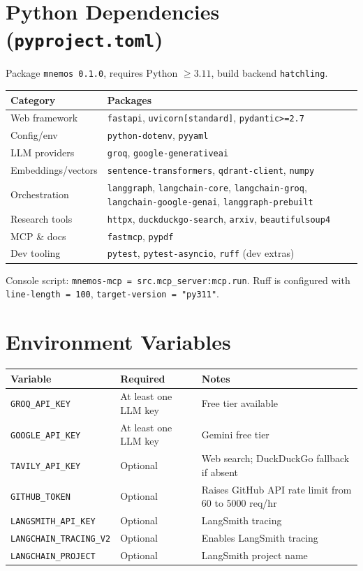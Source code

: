 \documentclass[11pt,a4paper]{report}
\newcommand{\code}[1]{\texttt{\small #1}}
\newcommand{\file}[1]{\texttt{\small\color{accent!70!black}#1}}
\begin{document}
\section{Python Dependencies (\file{pyproject.toml})}

Package \code{mnemos 0.1.0}, requires Python $\geq 3.11$, build backend \code{hatchling}.

\begin{longtable}{L{6.5cm}L{6.5cm}}
\toprule
\textbf{Category} & \textbf{Packages} \\
\midrule
\endhead
Web framework & \code{fastapi}, \code{uvicorn[standard]}, \code{pydantic>=2.7} \\
Config/env & \code{python-dotenv}, \code{pyyaml} \\
LLM providers & \code{groq}, \code{google-generativeai} \\
Embeddings/vectors & \code{sentence-transformers}, \code{qdrant-client}, \code{numpy} \\
Orchestration & \code{langgraph}, \code{langchain-core}, \code{langchain-groq}, \code{langchain-google-genai}, \code{langgraph-prebuilt} \\
Research tools & \code{httpx}, \code{duckduckgo-search}, \code{arxiv}, \code{beautifulsoup4} \\
MCP \& docs & \code{fastmcp}, \code{pypdf} \\
Dev tooling & \code{pytest}, \code{pytest-asyncio}, \code{ruff} (dev extras) \\
\bottomrule
\end{longtable}

Console script: \code{mnemos-mcp = src.mcp\_server:mcp.run}. Ruff is configured with \code{line-length = 100}, \code{target-version = "py311"}.

\section{Environment Variables}

\begin{longtable}{L{3.5cm}L{2cm}L{6.5cm}}
\toprule
\textbf{Variable} & \textbf{Required} & \textbf{Notes} \\
\midrule
\endhead
\code{GROQ\_API\_KEY} & At least one LLM key & Free tier available \\
\code{GOOGLE\_API\_KEY} & At least one LLM key & Gemini free tier \\
\code{TAVILY\_API\_KEY} & Optional & Web search; DuckDuckGo fallback if absent \\
\code{GITHUB\_TOKEN} & Optional & Raises GitHub API rate limit from 60 to 5000 req/hr \\
\code{LANGSMITH\_API\_KEY} & Optional & LangSmith tracing \\
\code{LANGCHAIN\_TRACING\_V2} & Optional & Enables LangSmith tracing \\
\code{LANGCHAIN\_PROJECT} & Optional & LangSmith project name \\
\bottomrule
\end{longtable}
\end{document}
